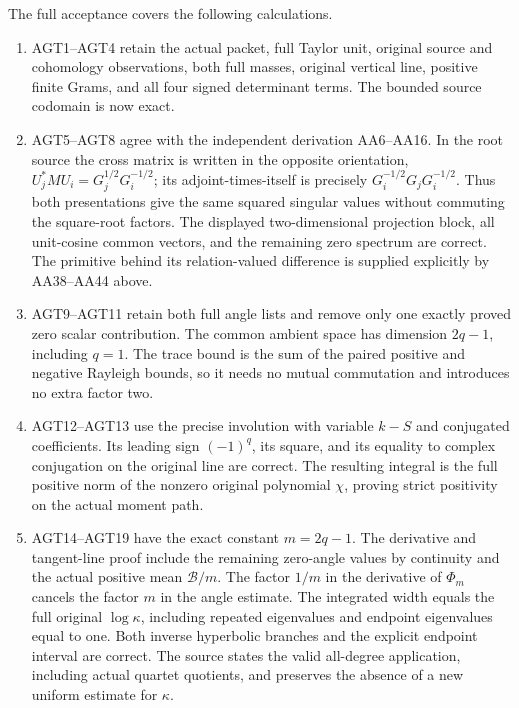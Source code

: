 \documentclass{article}
\begin{document}
The full acceptance covers the following calculations.

\begin{enumerate}
\def\labelenumi{\arabic{enumi}.}
\tightlist
\item
  AGT1--AGT4 retain the actual packet, full Taylor unit, original source and cohomology observations, both full masses, original vertical line, positive finite Grams, and all four signed determinant terms. The bounded source codomain is now exact.
\item
  AGT5--AGT8 agree with the independent derivation AA6--AA16. In the root source the cross matrix is written in the opposite orientation, \(U_j^*MU_i=G_j^{1/2}G_i^{-1/2}\); its adjoint-times-itself is precisely \(G_i^{-1/2}G_jG_i^{-1/2}\). Thus both presentations give the same squared singular values without commuting the square-root factors. The displayed two-dimensional projection block, all unit-cosine common vectors, and the remaining zero spectrum are correct. The primitive behind its relation-valued difference is supplied explicitly by AA38--AA44 above.
\item
  AGT9--AGT11 retain both full angle lists and remove only one exactly proved zero scalar contribution. The common ambient space has dimension \(2q-1\), including \(q=1\). The trace bound is the sum of the paired positive and negative Rayleigh bounds, so it needs no mutual commutation and introduces no extra factor two.
\item
  AGT12--AGT13 use the precise involution with variable \(k-S\) and conjugated coefficients. Its leading sign \((-1)^q\), its square, and its equality to complex conjugation on the original line are correct. The resulting integral is the full positive norm of the nonzero original polynomial \(\chi\), proving strict positivity on the actual moment path.
\item
  AGT14--AGT19 have the exact constant \(m=2q-1\). The derivative and tangent-line proof include the remaining zero-angle values by continuity and the actual positive mean \(\mathcal B/m\). The factor \(1/m\) in the derivative of \(\Phi_m\) cancels the factor \(m\) in the angle estimate. The integrated width equals the full original \(\log\kappa\), including repeated eigenvalues and endpoint eigenvalues equal to one. Both inverse hyperbolic branches and the explicit endpoint interval are correct. The source states the valid all-degree application, including actual quartet quotients, and preserves the absence of a new uniform estimate for \(\kappa\).
\end{enumerate}
\end{document}
